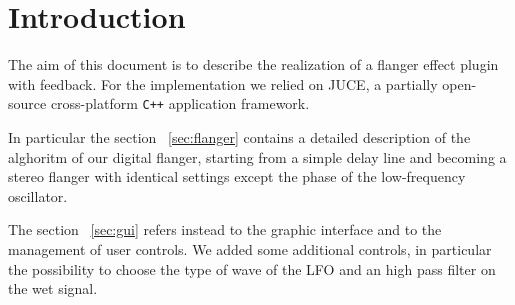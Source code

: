 \section{Introduction}

The aim of this document is to describe the realization of a flanger effect plugin with feedback. For the implementation we relied on JUCE, a partially open-source cross-platform \texttt{C++} application framework.

In particular the section ~\ref{sec:flanger} contains a detailed description of the alghoritm of our digital flanger, starting from a simple delay line and becoming a stereo flanger with identical settings except the phase of the low-frequency oscillator.

The section ~\ref{sec:gui} refers instead to the graphic interface and to the management of user controls. We added some additional controls, in particular the possibility to choose the type of wave of the LFO and an high pass filter on the wet signal.